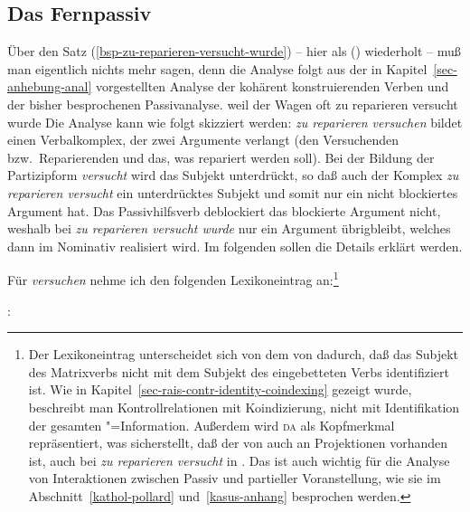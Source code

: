 {\subsection{Das Fernpassiv}
\label{sec-remote-passive-hpsg}


Über den Satz (\ref{bsp-zu-reparieren-versucht-wurde}) -- hier als () wiederholt --
muß man eigentlich nichts mehr sagen, denn die Analyse folgt aus der in Kapitel~\ref{sec-anhebung-anal}
vorgestellten Analyse der kohärent konstruierenden Verben und der bisher besprochenen
Passivanalyse.
\ea
\label{bsp-zu-reparieren-versucht-wurde-zwei}
weil    der Wagen oft zu reparieren versucht wurde
\z
Die Analyse kann wie folgt skizziert werden: \emph{zu reparieren versuchen} bildet einen
Verbalkomplex, der zwei Argumente verlangt (den Versuchenden bzw.\ Reparierenden und das, was
repariert werden soll). Bei der Bildung der Partizipform \emph{versucht} wird das Subjekt
unterdrückt, so daß auch der Komplex \emph{zu reparieren versucht} ein unterdrücktes Subjekt und
somit nur ein nicht blockiertes Argument hat. Das Passivhilfsverb deblockiert das blockierte
Argument nicht, weshalb bei \emph{zu reparieren versucht wurde} nur ein Argument übrigbleibt,
welches dann im Nominativ realisiert wird. Im folgenden sollen die Details erklärt werden.

Für \emph{versuchen} nehme ich den folgenden Lexikoneintrag an:\footnote{
        Der Lexikoneintrag unterscheidet sich von dem von
        \citet[]{HM94a} dadurch, daß das Subjekt des Matrixverbs
        nicht mit dem Subjekt des eingebetteten Verbs identifiziert ist.
        Wie in Kapitel~\ref{sec-rais-contr-identity-coindexing} gezeigt
        wurde, beschreibt man Kontrollrelationen mit Koindizierung, nicht mit Identifikation
        der gesamten "=Information.
        Außerdem wird \textsc{da} als Kopfmerkmal repräsentiert, was
        sicherstellt, daß der \daw von  auch an Projektionen vorhanden ist,
        \dash auch bei \emph{zu reparieren versucht} in .
        Das ist auch wichtig für die Analyse von Interaktionen zwischen Passiv
        und partieller Voranstellung, wie sie im Abschnitt~\ref{kathol-pollard}
        und~\ref{kasus-anhang} besprochen werden.%
}

\eas
\label{le-versuchen-da}
:\\
\zs

}
